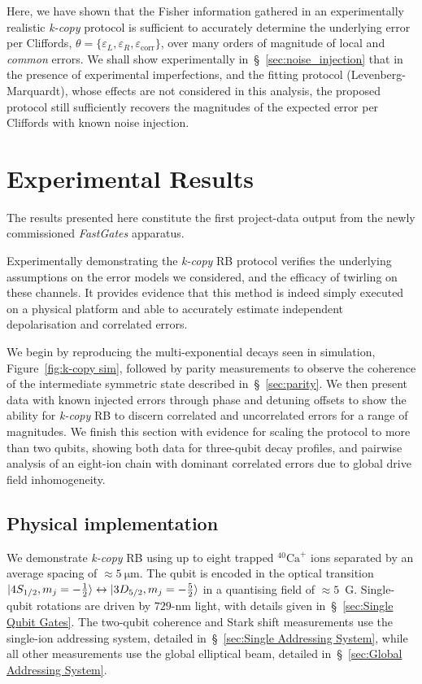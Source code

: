 Here, we have shown that the Fisher information gathered in an experimentally realistic \emph{k-copy} protocol is sufficient to accurately determine the underlying error per Cliffords, $\theta=\{\varepsilon_L, \varepsilon_R, \varepsilon_\mathrm{corr}\}$, over many orders of magnitude of local and \emph{common} errors. We shall show experimentally in~\S~\ref{sec:noise_injection} that in the presence of experimental imperfections, and the fitting protocol (Levenberg-Marquardt), whose effects are not considered in this analysis, the proposed protocol still sufficiently recovers the magnitudes of the expected error per Cliffords with known noise injection.



\section{Experimental Results}
\label{sec:results}

The results presented here constitute the first project-data output from
the newly commissioned \emph{FastGates} apparatus. 

Experimentally demonstrating the \emph{k-copy} RB protocol verifies the
underlying assumptions on the error models we considered, and the efficacy of twirling on these channels.
It provides evidence that this method is indeed simply executed on a physical
platform and able to accurately estimate independent depolarisation and
correlated errors. 

We begin by reproducing the multi-exponential decays seen in simulation, Figure~\ref{fig:k-copy sim}, followed by parity measurements to observe the coherence of the intermediate symmetric state described in~\S~\ref{sec:parity}. We then present data with known injected errors through phase and detuning offsets to show the ability for \emph{k-copy} RB to discern correlated and uncorrelated errors for a range of magnitudes. We finish this section with evidence for scaling the protocol to more than two qubits, showing both data for three-qubit decay profiles, and pairwise analysis of an eight-ion chain with dominant correlated errors due to global drive field inhomogeneity.

\subsection{Physical implementation}
We demonstrate \emph{k-copy} RB using up to eight
trapped $^{40}\text{Ca}^+$ ions separated by an average spacing of
$\approx\!5~\unit{\micro\meter}$.  The qubit is encoded in the optical transition
$\ket{4S_{1/2},m_j=-\frac{1}{2}}\leftrightarrow\ket{3D_{5/2},m_j=-\frac{5}{2}}$
in a quantising field of $\approx\!5$~G. Single-qubit rotations are driven by
$729$-$\unit{\nano\meter}$ light, with details given in~\S~\ref{sec:Single
Qubit Gates}.
The two-qubit coherence and Stark shift measurements use the
single-ion addressing system, detailed in~\S~\ref{sec:Single Addressing
System}, while all other measurements use the global elliptical beam, detailed
in~\S~\ref{sec:Global Addressing System}.

